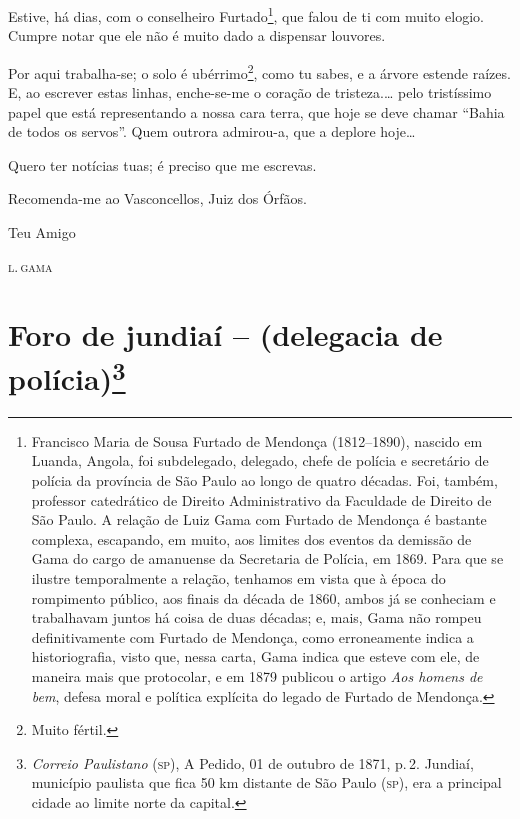Estive, há dias, com o conselheiro Furtado\footnote{ Francisco Maria de
  Sousa Furtado de Mendonça (1812--1890), nascido em Luanda, Angola, foi
  subdelegado, delegado, chefe de polícia e secretário de polícia da
  província de São Paulo ao longo de quatro décadas. Foi, também,
  professor catedrático de Direito Administrativo da Faculdade de
  Direito de São Paulo. A relação de Luiz Gama com Furtado de Mendonça é
  bastante complexa, escapando, em muito, aos limites dos eventos da
  demissão de Gama do cargo de amanuense da Secretaria de Polícia, em
  1869. Para que se ilustre temporalmente a relação, tenhamos em vista
  que à época do rompimento público, aos finais da década de 1860, ambos
  já se conheciam e trabalhavam juntos há coisa de duas décadas; e,
  mais, Gama não rompeu definitivamente com Furtado de Mendonça, como
  erroneamente indica a historiografia, visto que, nessa carta, Gama
  indica que esteve com ele, de maneira mais que protocolar, e em 1879
  publicou o artigo \emph{Aos homens de bem}, defesa moral e política
  explícita do legado de Furtado de Mendonça.}, que falou de ti com
muito elogio. Cumpre notar que ele não é muito dado a dispensar
louvores.

Por aqui {trabalha-se}; o solo é ubérrimo\footnote{ Muito fértil.},
como tu sabes, e a árvore estende raízes. E, ao escrever estas linhas,
enche-se-me o coração de tristeza.\ldots{} pelo tristíssimo papel que
está representando a nossa cara terra, que hoje se deve chamar ``Bahia de
todos os servos''. Quem outrora admirou-a, que a deplore hoje\ldots{}

Quero ter notícias tuas; é preciso que me escrevas.

Recomenda-me ao Vasconcellos, Juiz dos Órfãos.

\begin{flushright}
Teu Amigo

\textsc{l.\,gama}
\end{flushright}

\chapter{Foro de jundiaí -- (delegacia de polícia)\footnote{\emph{Correio Paulistano} (\textsc{sp}), A Pedido, 01 de outubro de 1871,
  p.\,2. Jundiaí, município paulista que fica 50 km distante de São Paulo
  (\textsc{sp}), era a principal cidade ao limite norte da capital.}} %

